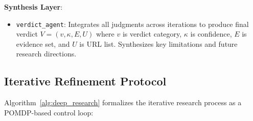 \textbf{Synthesis Layer}:
\begin{itemize}
    \item \texttt{verdict\_agent}: Integrates all judgments across iterations to produce final verdict $V = (v, \kappa, E, U)$ where $v$ is verdict category, $\kappa$ is confidence, $E$ is evidence set, and $U$ is URL list. Synthesizes key limitations and future research directions.
\end{itemize}

\subsection{Iterative Refinement Protocol}

Algorithm~\ref{alg:deep_research} formalizes the iterative research process as a POMDP-based control loop:

